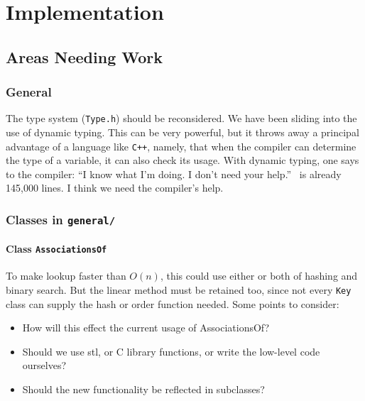 

\chapter{Implementation}

\section{Areas Needing Work}

\subsection{General}

The type system ({\tt Type.h}) should be reconsidered. We have been
sliding into the use of dynamic typing. This can be very powerful, but
it throws away a principal advantage of a language like {\tt C++},
namely, that when the compiler can determine the type of a variable,
it can also check its usage.  With dynamic typing, one says to the
compiler: ``I know what I'm doing. I don't need your help.'' \magnus\
is already 145,000 lines. I think we need the compiler's help.


\subsection{Classes in {\tt general/}}

\subsubsection{Class {\tt AssociationsOf}}

To make lookup faster than $O(n)$, this could use either or both of
hashing and binary search. But the linear method must be retained too,
since not every {\tt Key} class can supply the hash or order function
needed. Some points to consider:

\begin{itemize}

\item
How will this effect the current usage of AssociationsOf?

\item
Should we use stl, or C library functions, or write the low-level code
ourselves?

\item
Should the new functionality be reflected in subclasses?

\end{itemize}


